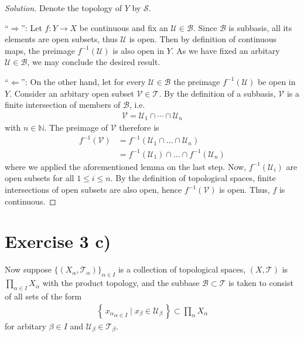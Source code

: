 \documentclass[a4paper]{article}
\newcommand{\makeset}[2]{\left\{\, #1 \mid #2 \,\right\}}
\begin{document}
\begin{proof}[Solution]
    Denote the topology of \(Y\) by \(\mathcal{S}\).

    ``\(\Rightarrow\)'': Let \(f: Y \longrightarrow X\) be continuous and fix an \(\mathcal{U} \in \mathcal{B}\). Since \(\mathcal{B}\) is subbasis, all its elements are open subsets, thus \(\mathcal{U}\) is open. Then by definition of continuous maps, the preimage \(f^{-1}(\mathcal{U})\) is also open in \(Y\). As we have fixed an arbitary \(\mathcal{U} \in \mathcal{B}\), we may conclude the desired result.

    ``\(\Leftarrow\)'': On the other hand, let for every \(\mathcal{U} \in \mathcal{B}\) the preimage \(f^{-1}(\mathcal{U})\) be open in \(Y\). Consider an arbitary open subset \(\mathcal{V} \in \mathcal{T}\). By the definition of a subbasis, \(\mathcal{V}\) is a finite intersection of members of \(\mathcal{B}\), i.e.
    \begin{align*}
        \mathcal{V} = \mathcal{U}_1 \cap \cdots \cap \mathcal{U}_n
    \end{align*}
    with \(n \in \mathbb{N}\). The preimage of \(\mathcal{V}\) therefore is
    \begin{align*}
        f^{-1}(\mathcal{V}) &= f^{-1}(\mathcal{U}_1 \cap \ldots \cap \mathcal{U}_n) \\
        &= f^{-1}(\mathcal{U}_1) \cap \ldots \cap f^{-1}(\mathcal{U}_n)
    \end{align*}
    where we applied the aforementioned lemma on the last step. Now, \(f^{-1}(\mathcal{U}_i)\) are open subsets for all \(1 \leq i \leq n\). By the definition of topological spaces, finite intersections of open subsets are also open, hence \(f^{-1}(\mathcal{V})\) is open. Thus, \(f\) is continuous.
\end{proof}


\section*{Exercise 3 c)}

Now suppose \(\{(X_\alpha, \mathcal{T}_\alpha)\}_{\alpha \in I}\) is a collection of topological spaces, \((X, \mathcal{T})\) is \(\prod_{\alpha \in I} X_\alpha\) with the product topology, and the subbase \(\mathcal{B} \subset \mathcal{T}\) is taken to consist of all sets of the form
\begin{align*}
    \makeset{{x_\alpha}_{\alpha \in I}}{x_\beta \in \mathcal{U}_\beta} \subset \prod_\alpha X_\alpha
\end{align*}
for arbitary \(\beta \in I\) and \(\mathcal{U}_\beta \in \mathcal{T}_\beta\).
\end{document}
